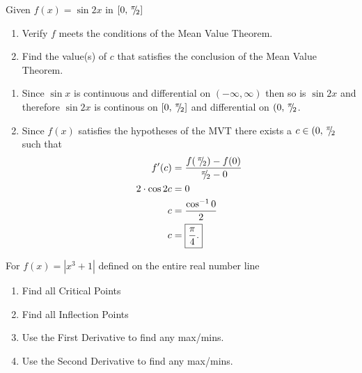 \documentclass{hwset}
\begin{document}
\begin{problem}[2.]
	Given $f(x) = \sin 2x $ in $[0, \,^{\pi}\!\!/\!_{2}]$
	\begin{enumerate}
		\item Verify $f$ meets the conditions of the Mean Value Theorem.
		\item Find the value(s) of $c$ that satisfies the conclusion of the Mean
			Value Theorem.
	\end{enumerate}
\end{problem}

\begin{enumerate}
	\item \begin{solution}
		Since $\sin x$ is continuous and differential on $(-\infty,\infty)$ then so
		is $\sin 2x$ and therefore $\sin 2x$ is continous on $[0,\,^{\pi}\!\!/\!_{2}]$
		and differential on $(0,\,^{\pi}\!\!/\!_{2}$.
	\end{solution}
	\item \begin{solution}
		Since $f(x)$ satisfies the hypotheses of the MVT there exists a $c\in
		(0,\,^{\pi}\!\!/\!_{2}$ such that 
		\begin{align*}
			f'(c) &= \dfrac{f(\,^{\pi}\!\!/\!_{2}) - f(0)}{\,^{\pi}\!\!/\!_{2} - 0} \\
			2\cdot \cos 2c &= 0 \\
			c &= \frac{\cos^{-1} 0}{2} \\
			c &= \boxed{\frac{\pi}{4}.}
		\end{align*}
	\end{solution}
\end{enumerate}

\begin{problem}[3.]
	For $f(x) = \left| x^3 + 1\right|$ defined on the entire real	number line
	\begin{enumerate}
		\item Find all Critical Points
		\item Find all Inflection Points
		\item Use the First Derivative to find any max/mins.
		\item Use the Second Derivative to find any max/mins.
	\end{enumerate}
\end{problem}
\end{document}
